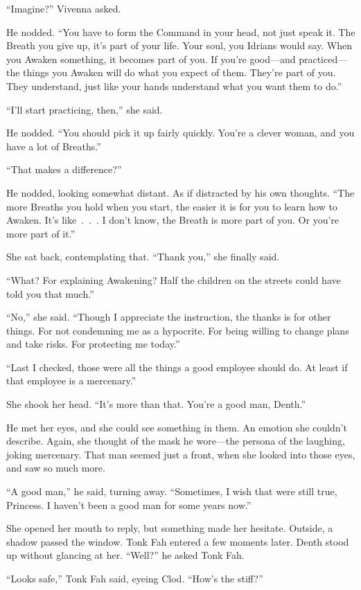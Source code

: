 “Imagine?” Vivenna asked.

He nodded. “You have to form the Command in your head, not just speak it. The Breath you give up, it’s part of your life. Your soul, you Idrians would say. When you Awaken something, it becomes part of you. If you’re good—and practiced—the things you Awaken will do what you expect of them. They’re part of you. They understand, just like your hands understand what you want them to do.”

“I’ll start practicing, then,” she said.

He nodded. “You should pick it up fairly quickly. You’re a clever woman, and you have a lot of Breaths.”

“That makes a difference?”

He nodded, looking somewhat distant. As if distracted by his own thoughts. “The more Breaths you hold when you start, the easier it is for you to learn how to Awaken. It’s like~.~.~. I don’t know, the Breath is more part of you. Or you’re more part of it.”

She sat back, contemplating that. “Thank you,” she finally said.

“What? For explaining Awakening? Half the children on the streets could have told you that much.”

“No,” she said. “Though I appreciate the instruction, the thanks is for other things. For not condemning me as a hypocrite. For being willing to change plans and take risks. For protecting me today.”

“Last I checked, those were all the things a good employee should do. At least if that employee is a mercenary.”

She shook her head. “It’s more than that. You’re a good man, Denth.”

He met her eyes, and she could see something in them. An emotion she couldn’t describe. Again, she thought of the mask he wore—the persona of the laughing, joking mercenary. That man seemed just a front, when she looked into those eyes, and saw so much more.

“A good man,” he said, turning away. “Sometimes, I wish that were still true, Princess. I haven’t been a good man for some years now.”

She opened her mouth to reply, but something made her hesitate. Outside, a shadow passed the window. Tonk Fah entered a few moments later. Denth stood up without glancing at her. “Well?” he asked Tonk Fah.

“Looks safe,” Tonk Fah said, eyeing Clod. “How’s the stiff?”

